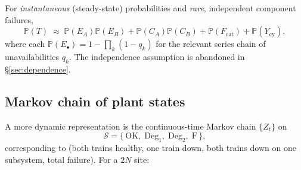 \documentclass[11pt,a4paper]{article}
\theoremstyle{ia}
\newcommand{\Prb}{\mathbb{P}}
\newcommand{\1}{\mathbf{1}}
\begin{document}
\noindent For \emph{instantaneous} (steady-state) probabilities and
\emph{rare}, independent component failures,
\begin{equation}\label{eq:fta-prob}
   \Prb(T) \;\approx\; \Prb(E_A)\Prb(E_B) + \Prb(C_A)\Prb(C_B)
              + \Prb(F_{\mathrm{cat}}) + \Prb(Y_{\mathrm{cy}}),
\end{equation}
where each $\Prb(E_\bullet)=1-\prod_k (1-q_k)$ for the relevant series
chain of unavailabilities $q_k$. The independence assumption is
abandoned in \S\ref{sec:dependence}.

\subsection{Markov chain of plant states}\label{ss:markov}

A more dynamic representation is the continuous-time Markov chain
$\{Z_t\}$ on
\begin{equation}
   \mathcal{S} = \{\,
       \mathrm{OK},\;\mathrm{Deg}_1,\;\mathrm{Deg}_2,\;\mathrm{F}\,\},
\end{equation}
corresponding to (both trains healthy, one train down,
both trains down on one subsystem, total failure). For a $2N$ site:
\end{document}
